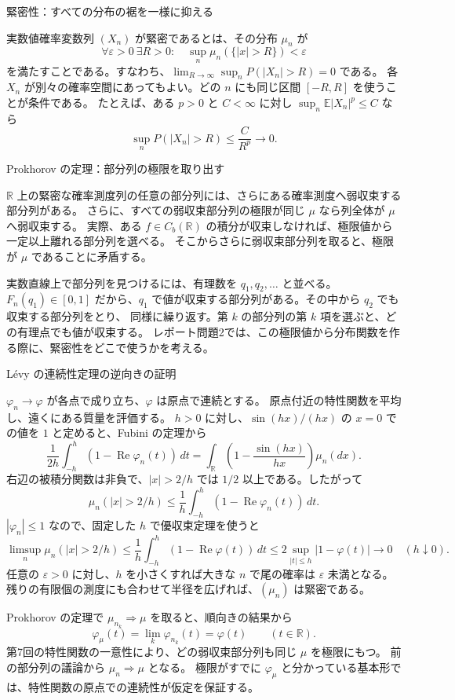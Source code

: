 \documentclass[a4paper,10pt,pdflatex,ja=standard,jafont=ipaex-type1,
  magstyle=real,scale=1]{bxjsarticle}
\newcommand{\topic}[1]{\par\vspace{5pt}
  {\large\sffamily\mdseries\color{accent}#1}\par\vspace{2pt}}
\newcommand{\R}{\mathbb R}
\newcommand{\E}{\mathbb E}
\begin{document}
\topic{緊密性：すべての分布の裾を一様に抑える}
実数値確率変数列 $(X_n)$ が緊密であるとは、その分布 $\mu_n$ が
$$\forall\varepsilon>0\ \exists R>0:\quad
 \sup_n\mu_n(\{|x|>R\})<\varepsilon$$
を満たすことである。すなわち、$\lim_{R\to\infty}\sup_nP(|X_n|>R)=0$ である。
各 $X_n$ が別々の確率空間にあってもよい。どの $n$ にも同じ区間 $[-R,R]$ を使うことが条件である。
たとえば、ある $p>0$ と $C<\infty$ に対し $\sup_n\E|X_n|^p\le C$ なら
$$\sup_nP(|X_n|>R)\le\frac C{R^p}\longrightarrow0.$$

\topic{Prokhorov の定理：部分列の極限を取り出す}
$\R$ 上の緊密な確率測度列の任意の部分列には、さらにある確率測度へ弱収束する部分列がある。
さらに、すべての弱収束部分列の極限が同じ $\mu$ なら列全体が $\mu$ へ弱収束する。
実際、ある $f\in C_b(\R)$ の積分が収束しなければ、極限値から一定以上離れる部分列を選べる。
そこからさらに弱収束部分列を取ると、極限が $\mu$ であることに矛盾する。

実数直線上で部分列を見つけるには、有理数を $q_1,q_2,\ldots$ と並べる。
$F_n(q_1)\in[0,1]$ だから、$q_1$ で値が収束する部分列がある。その中から $q_2$ でも収束する部分列をとり、
同様に繰り返す。第 $k$ の部分列の第 $k$ 項を選ぶと、どの有理点でも値が収束する。
レポート問題2では、この極限値から分布関数を作る際に、緊密性をどこで使うかを考える。

\newpage
\topic{L\'evy の連続性定理の逆向きの証明}
$\varphi_n\to\varphi$ が各点で成り立ち、$\varphi$ は原点で連続とする。
原点付近の特性関数を平均し、遠くにある質量を評価する。
$h>0$ に対し、$\sin(hx)/(hx)$ の $x=0$ での値を $1$ と定めると、Fubini の定理から
$$\frac1{2h}\int_{-h}^h(1-\operatorname{Re}\varphi_n(t))\,dt
 =\int_\R\left(1-\frac{\sin(hx)}{hx}\right)\mu_n(dx).$$
右辺の被積分関数は非負で、$|x|>2/h$ では $1/2$ 以上である。したがって
$$\mu_n(|x|>2/h)\le\frac1h\int_{-h}^h(1-\operatorname{Re}\varphi_n(t))\,dt.$$
$|\varphi_n|\le1$ なので、固定した $h$ で優収束定理を使うと
$$\limsup_n\mu_n(|x|>2/h)
 \le\frac1h\int_{-h}^h(1-\operatorname{Re}\varphi(t))\,dt
 \le2\sup_{|t|\le h}|1-\varphi(t)|\longrightarrow0\quad(h\downarrow0).$$
任意の $\varepsilon>0$ に対し、$h$ を小さくすれば大きな $n$ で尾の確率は
$\varepsilon$ 未満となる。残りの有限個の測度にも合わせて半径を広げれば、$(\mu_n)$ は緊密である。

Prokhorov の定理で $\mu_{n_k}\Rightarrow\mu$ を取ると、順向きの結果から
$$\varphi_\mu(t)=\lim_k\varphi_{n_k}(t)=\varphi(t)\qquad(t\in\R).$$
第7回の特性関数の一意性により、どの弱収束部分列も同じ $\mu$ を極限にもつ。
前の部分列の議論から $\mu_n\Rightarrow\mu$ となる。
極限がすでに $\varphi_\mu$ と分かっている基本形では、特性関数の原点での連続性が仮定を保証する。
\end{document}
